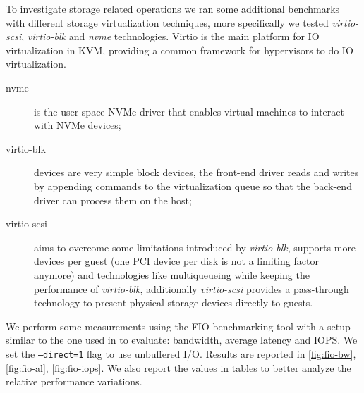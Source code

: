 \documentclass[twocolumn]{article}
\begin{document}
To investigate storage related operations we ran some additional benchmarks with different storage virtualization techniques, more specifically we tested \textit{virtio-scsi}, \textit{virtio-blk} and \textit{nvme} technologies. Virtio is the main platform for IO virtualization in KVM, providing a common framework for hypervisors to do IO virtualization.

\begin{description}
    \item[nvme] is the user-space NVMe driver that enables virtual machines to interact with NVMe devices;
    \item[virtio-blk] devices are very simple block devices, the front-end driver reads and writes by appending commands to the virtualization queue so that the back-end driver can process them on the host;
    \item[virtio-scsi] aims to overcome some limitations introduced by \textit{virtio-blk}, supports more devices per guest (one PCI device per disk is not a limiting factor anymore) and technologies like multiqueueing while keeping the performance of \textit{virtio-blk}, additionally \textit{virtio-scsi} provides a pass-through technology to present physical storage devices directly to guests.\cite{scsi}
\end{description}

We perform some measurements using the FIO \cite{fio} benchmarking tool with a setup similar to the one used in \cite{spool} to evaluate: bandwidth, average latency and IOPS. We set the \texttt{--direct=1} flag to use unbuffered I/O. Results are reported in \ref{fig:fio-bw}, \ref{fig:fio-al}, \ref{fig:fio-iops}. We also report the values in tables to better analyze the relative performance variations.
\end{document}
